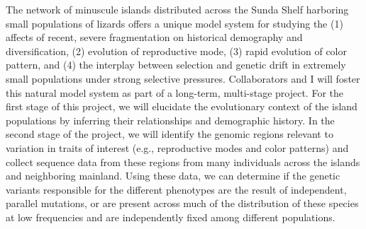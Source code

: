 The network of minuscule islands distributed across the Sunda Shelf harboring
small populations of lizards offers a unique model system for studying the 
(1) affects of recent, severe fragmentation on historical demography and
diversification,
(2) evolution of reproductive mode,
(3) rapid evolution of color pattern, and 
(4) the interplay between selection and genetic drift in extremely small
populations under strong selective pressures.
Collaborators and I will foster this natural model system as part of a
long-term, multi-stage project.
For the first stage of this project, we will elucidate the evolutionary context
of the island populations by inferring their relationships and demographic
history.
In the second stage of the project, we will identify the genomic regions
relevant to variation in traits of interest (e.g., reproductive modes and color
patterns) and collect sequence data from these regions from many individuals
across the islands and neighboring mainland.
Using these data, we can determine if the genetic variants responsible for the
different phenotypes are the result of independent, parallel mutations, or are
present across much of the distribution of these species at low frequencies and
are independently fixed among different populations.
